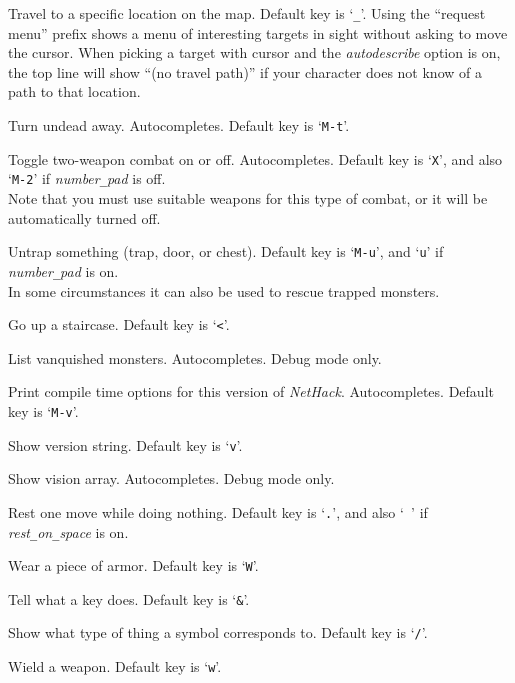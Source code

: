 \item[\tb{\#travel}]
Travel to a specific location on the map.
Default key is `{\tt \verb+_+}'.
Using the ``request menu'' prefix shows a menu of interesting targets in sight
without asking to move the cursor.
When picking a target with cursor and the {\it autodescribe\/}
option is on, the top line will show ``(no travel path)'' if
your character does not know of a path to that location.
\item[\tb{\#turn}]
Turn undead away. Autocompletes. Default key is `{\tt M-t}'.
\item[\tb{\#twoweapon}]
Toggle two-weapon combat on or off. Autocompletes.
Default key is `{\tt X}',
and also `{\tt M-2}' if {\it number\verb+_+pad\/} is off.\\
Note that you must
use suitable weapons for this type of combat, or it will
be automatically turned off.
\item[\tb{\#untrap}]
Untrap something (trap, door, or chest).
Default key is `{\tt M-u}', and `{\tt u}' if {\it number\verb+_+pad\/} is on.\\
In some circumstances it can also be used to rescue trapped monsters.
\item[\tb{\#up}]
Go up a staircase. Default key is `{\tt <}'.
\item[\tb{\#vanquished}]
List vanquished monsters.
Autocompletes.
Debug mode only.
\item[\tb{\#version}]
Print compile time options for this version of {\it NetHack\/}.
Autocompletes. Default key is `{\tt M-v}'.
\item[\tb{\#versionshort}]
Show version string. Default key is `{\tt v}'.
\item[\tb{\#vision}]
Show vision array.
Autocompletes.
Debug mode only.
\item[\tb{\#wait}]
Rest one move while doing nothing.
Default key is `{\tt .}', and also `{\tt{ }}' if
{\it rest\verb+_+on\verb+_+space\/} is on.
\item[\tb{\#wear}]
Wear a piece of armor. Default key is `{\tt W}'.
\item[\tb{\#whatdoes}]
Tell what a key does. Default key is `{\tt \&}'.
\item[\tb{\#whatis}]
Show what type of thing a symbol corresponds to. Default key is `{\tt /}'.
\item[\tb{\#wield}]
Wield a weapon. Default key is `{\tt w}'.
\item[\tb{\#wipe}]
